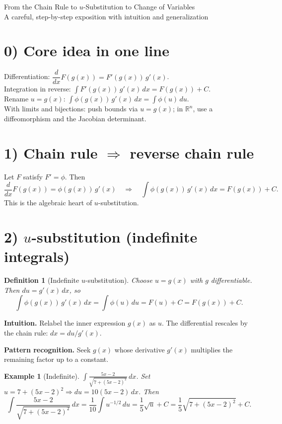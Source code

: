 \documentclass[12pt]{article}
\newtheorem{definition}{Definition}
\newtheorem{example}{Example}
\begin{document}
\begin{center}
{\LARGE From the Chain Rule to \texorpdfstring{$u$}{u}-Substitution to Change of Variables}\\[0.5em]
{\large A careful, step-by-step exposition with intuition and generalization}
\end{center}

\section*{0) Core idea in one line}
Differentiation: \(\dfrac{d}{dx}F(g(x))=F'(g(x))\,g'(x)\).\\
Integration in reverse: \(\displaystyle \int F'(g(x))\,g'(x)\,dx=F(g(x))+C\).\\
Rename \(u=g(x)\): \(\displaystyle \int \phi(g(x))\,g'(x)\,dx=\int \phi(u)\,du\).\\
With limits and bijections: push bounds via \(u=g(x)\); in \(\mathbb R^n\), use a diffeomorphism and the Jacobian determinant.

\section*{1) Chain rule \(\Rightarrow\) reverse chain rule}
Let \(F\) satisfy \(F'=\phi\). Then
\[
\frac{d}{dx}F(g(x))=\phi(g(x))\,g'(x) \quad\Longrightarrow\quad
\int \phi(g(x))\,g'(x)\,dx=F(g(x))+C.
\]
This is the algebraic heart of \(u\)-substitution.

\section*{2) \texorpdfstring{$u$}{u}-substitution (indefinite integrals)}
\begin{definition}[Indefinite \(u\)-substitution]
Choose \(u=g(x)\) with \(g\) differentiable. Then \(du=g'(x)\,dx\), so
\[
\int \phi(g(x))\,g'(x)\,dx=\int \phi(u)\,du=F(u)+C=F(g(x))+C.
\]
\end{definition}

\noindent\textbf{Intuition.} Relabel the inner expression \(g(x)\) as \(u\). The differential rescales by the chain rule: \(dx=du/g'(x)\).

\noindent\textbf{Pattern recognition.} Seek \(g(x)\) whose derivative \(g'(x)\) multiplies the remaining factor up to a constant.

\begin{example}[Indefinite]
\(\displaystyle \int \frac{5x-2}{\sqrt{7+(5x-2)^2}}\,dx\).
Set \(u=7+(5x-2)^2\Rightarrow du=10(5x-2)\,dx\). Then
\[
\int \frac{5x-2}{\sqrt{7+(5x-2)^2}}\,dx
=\frac{1}{10}\int u^{-1/2}\,du
=\frac{1}{5}\sqrt{u}+C
=\frac{1}{5}\sqrt{7+(5x-2)^2}+C.
\]
\end{example}
\end{document}
